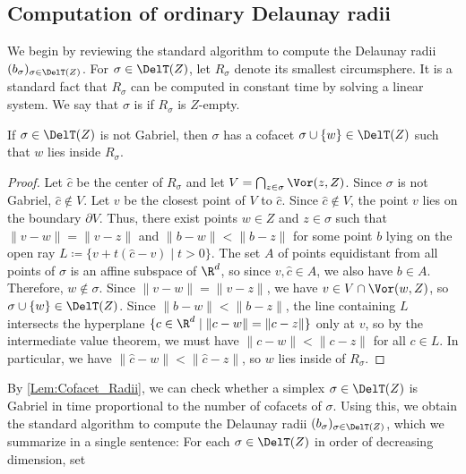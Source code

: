 \subsection{Computation of ordinary Delaunay radii}\label{Sec:Ordinary_Del_Radii}
We begin by reviewing the standard algorithm to compute the Delaunay radii $(b_{\sigma})_{\sigma\in \DelT(Z)}$.  For $\sigma \in \DelT(Z)$, let $R_{\sigma}$ denote its smallest circumsphere.  It is a standard fact that $R_{\sigma}$ can be computed in constant time by solving a linear system.  We say that $\sigma$ is   if $R_{\sigma}$ is $Z$-empty. %
\begin{lemma}\label{Lem:Cofacet_Radii}
If $\sigma \in \DelT(Z)$ is not Gabriel, then $\sigma$ has a cofacet $\sigma \cup \{w\} \in \DelT(Z)$ such that $w$ lies inside $R_{\sigma}$.
\end{lemma}
%
\begin{proof}
Let $\hat c$ be the center of $R_{\sigma}$ and let $V=\bigcap_{z\in \sigma} \Vor(z,Z)$.  Since $\sigma$ is not Gabriel, $\hat c \notin V$. Let $v$ be the closest point of $V$ to $\hat c$. Since $\hat c \notin V$, the point $v$ lies on the boundary $\partial V$.  Thus, there exist points $w \in Z$ and $z\in \sigma$ such that $\|v-w\|=\|v-z\|$ and $\|b-w\|<\|b-z\|$ for some point $b$ lying on the open ray $L\coloneqq \{v+t(\hat c-v)\mid t>0\}$.  The set $A$ of points equidistant from all points of $\sigma$ is an affine subspace of $\R^d$, so since $v,\hat c\in A$, we also have $b\in A$.  Therefore, $w\not\in\sigma$.  Since $\|v-w\|=\|v-z\|$, we have $v \in V\cap \Vor(w,Z)$, so $\sigma \cup \{w\} \in \DelT(Z)$.  Since $\|b-w\|< \|b-z\|$, the line containing $L$ intersects the hyperplane $\{c\in \R^d \mid \|c-w\|=\|c-z\|\}$ only at $v$, so by the intermediate value theorem, we must have  $\|c-w\|<\|c-z\|$ for all $c\in L$.  In particular, we have  $\|\hat c-w\|<\|\hat c-z\|$, so $w$ lies inside of $R_{\sigma}$.
\end{proof}
%
By \cref{Lem:Cofacet_Radii}, we can check whether a simplex $\sigma\in \DelT(Z)$ is Gabriel in time proportional to the number of cofacets of $\sigma$.  Using this, we obtain the standard algorithm to compute the Delaunay radii $(b_{\sigma})_{\sigma\in \DelT(Z)}$, which we summarize in a single sentence: For each $\sigma \in \DelT(Z)$ in order of decreasing dimension, set 
